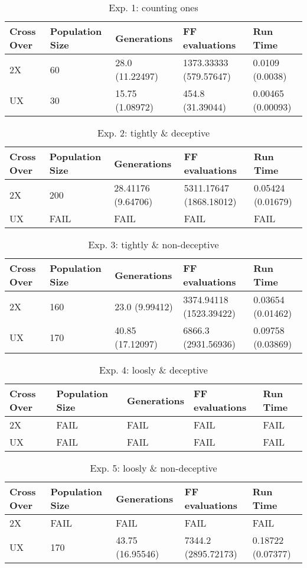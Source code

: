 \documentclass{article}%
\begin{document}
%
\normalsize%


\begin{table}[htbp]%
\caption{Exp. 1: counting ones}%
\begin{tabular}{l l l l l}%
Cross Over&Population Size&Generations&FF evaluations&Run Time\\%
\hline%
2X&60&28.0 (11.22497)&1373.33333 (579.57647)&0.0109 (0.0038)\\%
UX&30&15.75 (1.08972)&454.8 (31.39044)&0.00465 (0.00093)\\%
\end{tabular}%
\end{table}

%


\begin{table}[htbp]%
\caption{Exp. 2: tightly \& deceptive}%
\begin{tabular}{l l l l l}%
Cross Over&Population Size&Generations&FF evaluations&Run Time\\%
\hline%
2X&200&28.41176 (9.64706)&5311.17647 (1868.18012)&0.05424 (0.01679)\\%
UX&FAIL&FAIL&FAIL&FAIL\\%
\end{tabular}%
\end{table}

%


\begin{table}[htbp]%
\caption{Exp. 3: tightly \& non{-}deceptive}%
\begin{tabular}{l l l l l}%
Cross Over&Population Size&Generations&FF evaluations&Run Time\\%
\hline%
2X&160&23.0 (9.99412)&3374.94118 (1523.39422)&0.03654 (0.01462)\\%
UX&170&40.85 (17.12097)&6866.3 (2931.56936)&0.09758 (0.03869)\\%
\end{tabular}%
\end{table}

%


\begin{table}[htbp]%
\caption{Exp. 4: loosly \& deceptive}%
\begin{tabular}{l l l l l}%
Cross Over&Population Size&Generations&FF evaluations&Run Time\\%
\hline%
2X&FAIL&FAIL&FAIL&FAIL\\%
UX&FAIL&FAIL&FAIL&FAIL\\%
\end{tabular}%
\end{table}

%


\begin{table}[htbp]%
\caption{Exp. 5: loosly \& non{-}deceptive}%
\begin{tabular}{l l l l l}%
Cross Over&Population Size&Generations&FF evaluations&Run Time\\%
\hline%
2X&FAIL&FAIL&FAIL&FAIL\\%
UX&170&43.75 (16.95546)&7344.2 (2895.72173)&0.18722 (0.07377)\\%
\end{tabular}%
\end{table}

%
\end{document}
